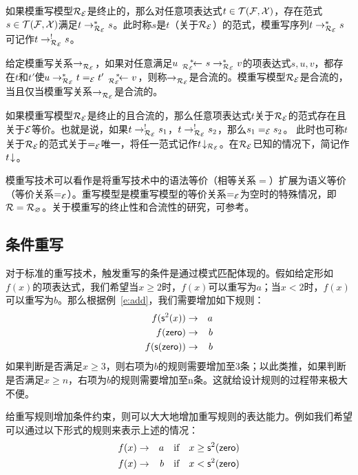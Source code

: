 \begin{lemma}
如果模重写模型$\RE$是终止的，那么对任意项表达式$t\in\TFX$，存在范式$s\in\TFX$满足$t\lrps{*}{\RE} s$。此时称$s$是$t$（关于$\RE$）的范式，模重写序列$t\lrps{*}{\RE} s$可记作$t\lrps{!}{\RE} s$。
\end{lemma}

\begin{definition}
给定模重写关系$\lrps{}{\RE}$，如果对任意满足$u\rlps{*}{\RE} s \lrps{*}{\RE} v$的项表达式$s,u,v$，都存在$t$和$t'$使$u\lrps{*}{\RE} t =_{\cE} t' \rlps{*}{\RE} v$，则称$\lrps{}{\RE}$是合流的。模重写模型$\RE$是合流的，当且仅当模重写关系$\lrps{}{\RE}$是合流的。
\end{definition}

\begin{lemma}
如果模重写模型$\RE$是终止的且合流的，那么任意项表达式$t$关于$\RE$的范式存在且关于$\cE$等价。也就是说，如果$t\lrps{!}{\RE} s_1$，$t\lrps{!}{\RE} s_2$，那么$s_1 =_{\cE} s_2$。 此时也可称$t$关于$\RE$的范式关于$=_{\cE}$唯一，将任一范式记作$\nf{t}{\RE}$。在$\RE$已知的情况下，简记作$\nf{t}{}$。
\end{lemma}

模重写技术可以看作是将重写技术中的语法等价（相等关系$=$）扩展为语义等价（等价关系$=_{\cE}$）。重写模型是模重写模型的等价关系$=_{\cE}$为空时的特殊情况，即$\cR = \cR_{\emptyset}$。关于模重写的终止性和合流性的研究，可参考。


\subsection{条件重写}

对于标准的重写技术，触发重写的条件是通过模式匹配体现的。假如给定形如$f(x)$的项表达式，我们希望当$x\ge 2$时，$f(x)$可以重写为$a$；当$x<2$时，$f(x)$可以重写为$b$。那么根据例~\ref{e:add}，我们需要增加如下规则：
\begin{eqnarray}
f(\s^2(x)) & \ra & a \nonumber \\
f(\zero)  & \ra & b \nonumber \\
f(\s(\zero)) & \ra & b \nonumber
\end{eqnarray}
如果判断是否满足$x\ge 3$，则右项为$b$的规则需要增加至3条；以此类推，如果判断是否满足$x\ge n$，右项为$b$的规则需要增加至n条。这就给设计规则的过程带来极大不便。

给重写规则增加条件约束，则可以大大地增加重写规则的表达能力。例如我们希望可以通过以下形式的规则来表示上述的情况：
\begin{eqnarray}
f(x) & \ra & a ~~\mbox{ if }~~ x\ge \s^2(\zero) \nonumber \\
f(x)  & \ra & b ~~\mbox{ if }~~ x < \s^2(\zero) \nonumber 
\end{eqnarray}


